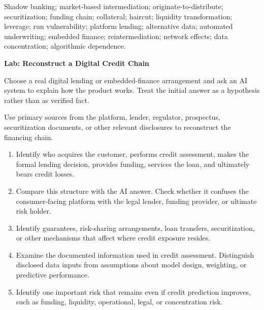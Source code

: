 
Shadow banking; market-based intermediation; originate-to-distribute;
securitization; funding chain; collateral; haircut; liquidity transformation;
leverage; run vulnerability; platform lending; alternative data;
automated underwriting; embedded finance; reintermediation;
network effects; data concentration; algorithmic dependence.



\textbf{Lab: Reconstruct a Digital Credit Chain}

Choose a real digital lending or embedded-finance arrangement and ask an AI system to explain how the product works. Treat the initial answer as a hypothesis rather than as verified fact.

Use primary sources from the platform, lender, regulator, prospectus, securitization documents, or other relevant disclosures to reconstruct the financing chain.

\begin{enumerate}

\item Identify who acquires the customer, performs credit assessment, makes the formal lending decision, provides funding, services the loan, and ultimately bears credit losses.

\item Compare this structure with the AI answer. Check whether it confuses the consumer-facing platform with the legal lender, funding provider, or ultimate risk holder.

\item Identify guarantees, risk-sharing arrangements, loan transfers, securitization, or other mechanisms that affect where credit exposure resides.

\item Examine the documented information used in credit assessment. Distinguish disclosed data inputs from assumptions about model design, weighting, or predictive performance.

\item Identify one important risk that remains even if credit prediction improves, such as funding, liquidity, operational, legal, or concentration risk.

\end{enumerate}

